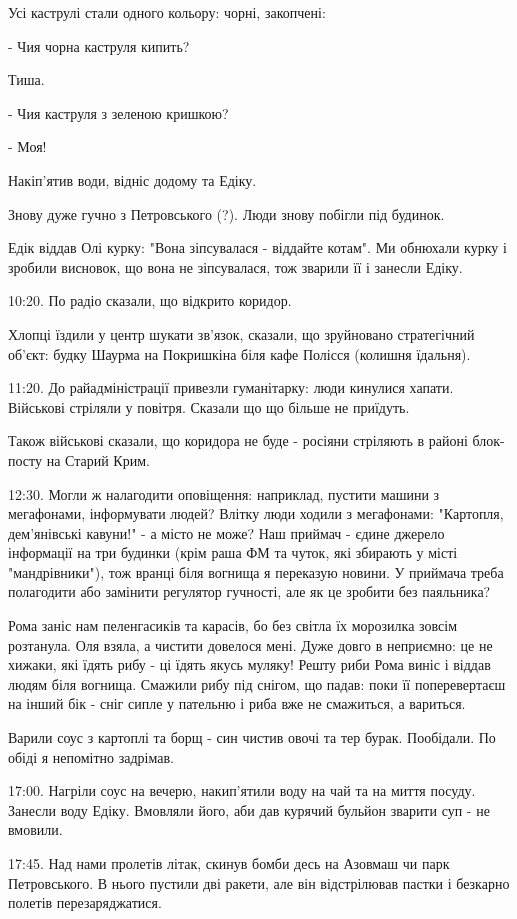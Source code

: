 Усі каструлі стали одного кольору: чорні, закопчені:

- Чия чорна каструля кипить?

Тиша.

- Чия каструля з зеленою кришкою?

- Моя!

Накіп'ятив води, відніс додому та Едіку.

Знову дуже гучно з Петровського (?). Люди знову побігли під будинок.

Едік віддав Олі курку: "Вона зіпсувалася - віддайте котам". Ми обнюхали курку і
зробили висновок, що вона не зіпсувалася, тож зварили її і занесли Едіку. 

10:20. По радіо сказали, що відкрито коридор.

Хлопці їздили у центр шукати зв'язок, сказали, що зруйновано стратегічний
об'єкт: будку Шаурма на Покришкіна біля кафе Полісся (колишня їдальня).

11:20. До райадміністрації привезли гуманітарку: люди кинулися хапати.
Військові стріляли у повітря. Сказали що що більше не приїдуть.

Також військові сказали, що коридора не буде - росіяни стріляють в районі
блок-посту на Старий Крим. 

12:30. Могли ж налагодити оповіщення: наприклад,  пустити машини з мегафонами,
інформувати людей? Влітку люди ходили з мегафонами: "Картопля, дем'янівські
кавуни!" - а місто не може? Наш приймач - єдине джерело інформації на три
будинки (крім раша ФМ та чуток, які збирають у місті "мандрівники"), тож вранці
біля вогнища я переказую новини. У приймача треба полагодити або замінити
регулятор гучності, але як це зробити без паяльника?

Рома заніс нам пеленгасиків та карасів, бо без світла їх морозилка зовсім
розтанула. Оля взяла, а чистити довелося мені. Дуже довго в неприємно: це не
хижаки, які їдять рибу - ці їдять якусь муляку! Решту риби Рома виніс і віддав
людям біля вогнища. Смажили рибу під снігом, що падав: поки її поперевертаєш на
інший бік - сніг сипле у пательню і риба вже не смажиться, а вариться.

Варили соус з картоплі та борщ - син чистив овочі та тер бурак. Пообідали. По
обіді я непомітно задрімав.

17:00. Нагріли соус на вечерю, накип'ятили воду на чай та на миття посуду.
Занесли воду Едіку. Вмовляли його, аби дав курячий бульйон зварити суп - не
вмовили.

17:45. Над нами пролетів літак, скинув бомби десь на Азовмаш чи парк
Петровського. В нього пустили дві ракети, але він відстрілював пастки і
безкарно полетів перезаряджатися.

